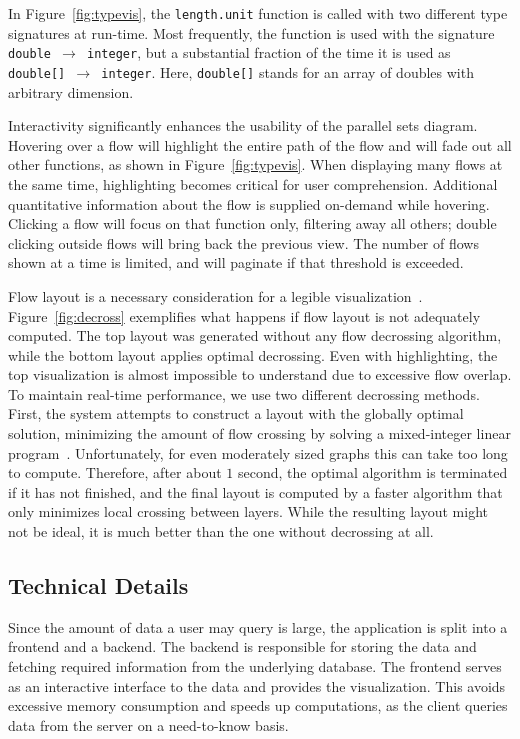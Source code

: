 \documentclass[review]{vgtc}                 %
\newcommand{\figref}[1]{Figure~\ref{#1}\xspace}
\begin{document}
In \figref{fig:typevis},
the {\tt length.unit} function is called with
two different type signatures at run-time.
Most frequently, the function is used with the
signature {\tt double $\to$ integer},
but a substantial fraction of the time it is
used as {\tt double[] $\to$ integer}.
Here, {\tt double[]} stands for an array of
doubles with arbitrary dimension.

Interactivity significantly enhances the
usability of the parallel sets diagram.
Hovering over a flow will highlight the
entire path of the flow
and will fade out all other functions,
as shown in \figref{fig:typevis}.
When displaying many flows at the same time,
highlighting becomes critical
for user comprehension.
Additional quantitative information
about the flow is supplied on-demand while hovering.
Clicking a flow will focus on that function
only, filtering away all others;
double clicking outside flows will bring back the previous view.
The number of flows shown at a time is limited,
and will paginate if that threshold is exceeded.

Flow layout is a necessary consideration
for a legible visualization~\cite{sugiyama:1981}.
Figure~\ref{fig:decross} exemplifies what
happens if flow layout is not adequately computed.
The top layout was generated without any
flow decrossing algorithm,
while the bottom layout applies optimal decrossing.
Even with highlighting,
the top visualization is almost impossible to understand
due to excessive flow overlap.
To maintain real-time performance,
we use two different decrossing methods.
First, the system attempts to construct
a layout with the globally optimal solution,
minimizing the amount of flow crossing by
solving a mixed-integer linear program~\cite{ebner:2005}.
Unfortunately, for even moderately
sized graphs this can take too long to compute.
Therefore, after about $1$ second,
the optimal algorithm is terminated
if it has not finished, and the final layout is computed
by a faster
algorithm that only minimizes local crossing between layers.
While the resulting layout might not be ideal,
it is much better than the one without decrossing at all.

\subsection{Technical Details}

Since the amount of data a user may query is large,
the application is split into a frontend and a backend.
The backend is responsible for storing the data
and fetching required information from the underlying database.
The frontend serves as an interactive interface to the data
and provides the visualization.
This avoids excessive memory consumption and speeds up computations,
as the client queries data from the server on a need-to-know basis.
\end{document}
